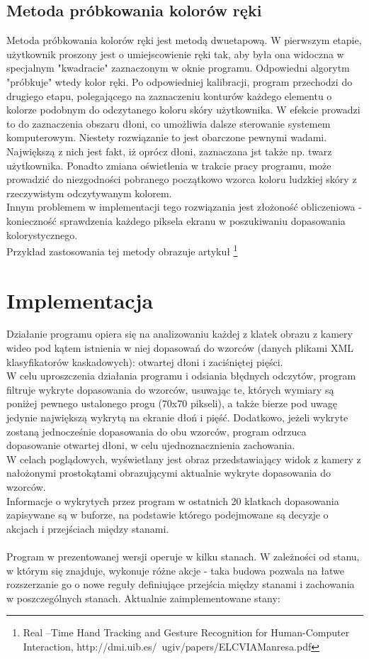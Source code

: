 \documentclass[a4paper,12pt]{article}
\begin{document}
\subsection{Metoda próbkowania kolorów ręki}
Metoda próbkowania kolorów ręki jest metodą dwuetapową. W pierwszym etapie, użytkownik proszony jest o umiejscowienie ręki tak, aby była ona widoczna w specjalnym "kwadracie" zaznaczonym w oknie programu. Odpowiedni algorytm "próbkuje" wtedy kolor ręki. Po odpowiedniej kalibracji, program przechodzi do drugiego etapu, polegającego na zaznaczeniu konturów każdego elementu o kolorze podobnym do odczytanego koloru skóry użytkownika. W efekcie prowadzi to do zaznaczenia obszaru dłoni, co umożliwia dalsze sterowanie systemem komputerowym. Niestety rozwiązanie to jest obarczone pewnymi wadami. Największą z nich jest fakt, iż oprócz dłoni, zaznaczana jst także np. twarz użytkownika. Ponadto zmiana oświetlenia w trakcie pracy programu, może prowadzić do niezgodności pobranego początkowo wzorca koloru ludzkiej skóry z rzeczywistym odczytywanym kolorem.\\
Innym problemem w implementacji tego rozwiązania jest złożoność obliczeniowa - konieczność sprawdzenia każdego piksela ekranu w poszukiwaniu dopasowania kolorystycznego.\\
Przykład zastosowania tej metody obrazuje artykuł \footnote{Real –Time Hand Tracking and Gesture Recognition for Human-Computer Interaction, http://dmi.uib.es/~ugiv/papers/ELCVIAManresa.pdf}   


\section{Implementacja}

Działanie programu opiera się na analizowaniu każdej z klatek obrazu z kamery wideo pod kątem istnienia w niej dopasowań do wzorców (danych plikami XML klasyfikatorów kaskadowych): otwartej dłoni i zaciśniętej pięści.\\
W celu uproszczenia działania programu i odsiania błędnych odczytów, program filtruje wykryte dopasowania do wzorców, usuwając te, których wymiary są poniżej pewnego ustalonego progu (70x70 pikseli), a także bierze pod uwagę jedynie największą wykrytą na ekranie dłoń i pięść. Dodatkowo, jeżeli wykryte zostaną jednocześnie dopasowania do obu wzorców, program odrzuca dopasowanie otwartej dłoni, w celu ujednoznacznienia zachowania.\\
W celach poglądowych, wyświetlany jest obraz przedstawiający widok z kamery z nałożonymi prostokątami obrazującymi aktualnie wykryte dopasowania do wzorców.\\
Informacje o wykrytych przez program w ostatnich 20 klatkach dopasowania zapisywane są w buforze, na podstawie którego podejmowane są decyzje o akcjach i przejściach między stanami.\\
\\
Program w prezentowanej wersji operuje w kilku stanach. W zależności od stanu, w którym się znajduje, wykonuje różne akcje - taka budowa pozwala na łatwe rozszerzanie go o nowe reguły definiujące przejścia między stanami i zachowania w poszczególnych stanach. Aktualnie zaimplementowane stany:
\end{document}
